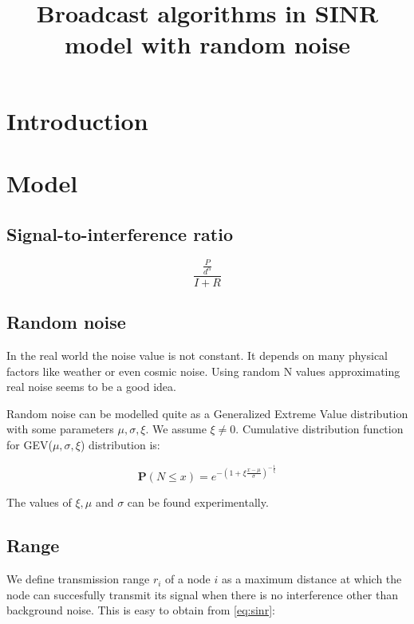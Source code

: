 \documentclass[a4paper,draft,12pt]{report}
\title{Broadcast algorithms in SINR model with random noise}
\begin{document}
\maketitle

\chapter{Introduction}

\chapter{Model}

\section{Signal-to-interference ratio}

\begin{equation}
\label{eq:sinr}
\frac{\frac{P}{d^\alpha}}{I + R}
\end{equation}

\section{Random noise}

In the real world the noise value is not constant. It depends on many physical factors like weather or even cosmic noise. Using random N values approximating real noise seems to be a good idea.

Random noise can be modelled quite as a Generalized Extreme Value  \cite{gev} distribution with some parameters $\mu, \sigma, \xi$. We assume $\xi \neq 0$. Cumulative distribution function for GEV($\mu, \sigma, \xi$) distribution is:

\begin{equation}
\label{eq:gev_cdf}
\textbf{P}(N \leq x) = e^{-(1 + \xi \frac{x - \mu}{\sigma}) ^ {-\frac{1}{\xi}}}
\end{equation}

The values of $\xi, \mu$ and $\sigma$ can be found experimentally.

\section{Range}

We define transmission range $r_i$ of a node $i$ as a maximum distance at which the node can succesfully transmit its signal when there is no interference other than background noise. This is easy to obtain from \eqref{eq:sinr}:
\end{document}
